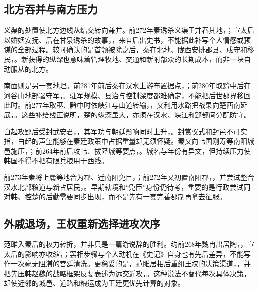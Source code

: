 \subsection{北方吞并与南方压力}

义渠的处置使北方边线从结交转向兼并。前272年秦诱杀义渠王并吞其地，；宣太后以婚姻安抚、后在甘泉诱杀的故事，，来自后出史书，不能据此补写个人情感或预谋的全部过程。较可确认的是首领被除之后，秦在北地、陇西安排郡县、戍守和移民，。新获得的纵深也意味着管理牧地、交通和新附部众的长期成本，而非一块自动服从的北方。

南面则是另一套地理。前281年前后秦在汉水上游布置据点，；前280年取黔中后在河谷山地部署守军，。驻军规模、县治与控制深度都难确定，不能把后世郡界移回此时。前277年取巫、黔中时依峡江与山道转输，，又利用水路把战果向楚西南延展，。这些补给线正说明，楚的纵深虽大，亦须在汉水、峡江和郢都间分配防守。

白起攻郢后受封武安君，，其军功与朝廷影响同时上升，。封赏仪式和封邑不可实指，白起的声望能够在秦廷政策中占据重量却无须怀疑。秦又向韩国刚寿等南阳城邑施压，；前264年前后攻韩、拔陉城等要点，。城名与年份有异文，但持续压力使韩国不得不把有限兵粮用于西线。

前273年秦将上庸等地合为郡、迁南阳免臣，；前272年又初置南阳郡，，并尝试整合汉水北部粮道与新占居民，。早期辖境和“免臣”身份仍待考，重要的是行政尝试同对韩、控楚的后勤需要同步出现，而不是先有一套完善郡制再拿去征服。

\subsection{外戚退场，王权重新选择进攻次序}

范雎入秦后的权力转折，并非只是一篇游说辞的胜利。约前268年魏冉出居陶，，宣太后的影响亦收缩，；罢相步骤与个人动机在《史记》自身也有先后差异，不能写作一次毫无阻滞的宫廷清洗。更稳妥的是，范雎居相后重组王权的决策渠道，，并把先压韩赵魏的战略框架反复表述为远交近攻，。这种说法不替代每次具体决策，却使近邻的城邑、道路和粮运成为王廷更优先计算的对象。

